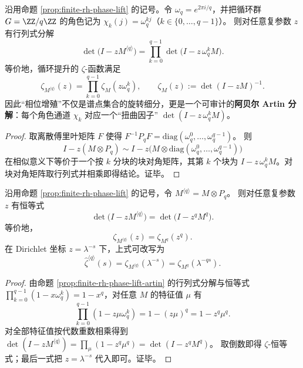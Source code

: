 \begin{proposition}\label{prop:finite-rh-phase-lift-artin}
沿用命题 \ref{prop:finite-rh-phase-lift} 的记号。令
\(
\omega_q=e^{2\pi i/q}
\)，并把循环群 \(G=\ZZ/q\ZZ\) 的角色记为 \(\chi_k(j)=\omega_q^{kj}\)（\(k\in\{0,\dots,q-1\}\)）。
则对任意复参数 \(z\) 有行列式分解
\[
\det\!\bigl(I-zM^{\langle q\rangle}\bigr)
=\prod_{k=0}^{q-1}\det\!\bigl(I-z\,\omega_q^k M\bigr).
\]
等价地，循环提升的 \(\zeta\)-函数满足
\[
\zeta_{M^{\langle q\rangle}}(z)
=\prod_{k=0}^{q-1}\zeta_{M}(z\omega_q^k),
\qquad
\zeta_M(z):=\det(I-zM)^{-1}.
\]
因此“相位增殖”不仅是谱点集合的旋转细分，更是一个可审计的\textbf{阿贝尔 Artin 分解}：每个角色通道 \(\chi_k\) 对应一个“扭曲因子” \(\det(I-z\,\omega_q^k M)\)。
\end{proposition}

\begin{proof}
取离散傅里叶矩阵 \(F\) 使得 \(F^{-1}P_qF=\mathrm{diag}(\omega_q^0,\dots,\omega_q^{q-1})\)。
则
\[
I-z(M\otimes P_q)
\sim
I-z\bigl(M\otimes \mathrm{diag}(\omega_q^0,\dots,\omega_q^{q-1})\bigr)
\]
在相似意义下等价于一个按 \(k\) 分块的块对角矩阵，其第 \(k\) 个块为 \(I-z\,\omega_q^k M\)。对块对角矩阵取行列式并相乘即得结论。证毕。
\end{proof}

\begin{corollary}\label{cor:finite-rh-phase-lift-time-rescale}
沿用命题 \ref{prop:finite-rh-phase-lift} 的记号，令 \(M^{\langle q\rangle}=M\otimes P_q\)。
则对任意复参数 \(z\) 有恒等式
\[
\det\!\bigl(I-zM^{\langle q\rangle}\bigr)=\det\!\bigl(I-z^q M^q\bigr).
\]
等价地，
\[
\zeta_{M^{\langle q\rangle}}(z)=\zeta_{M^q}(z^q).
\]
在 Dirichlet 坐标 \(z=\lambda^{-s}\) 下，上式可改写为
\[
\widehat{\zeta}^{\langle q\rangle}(s)
=\zeta_{M^{\langle q\rangle}}(\lambda^{-s})
=\zeta_{M^q}(\lambda^{-qs}).
\]
\end{corollary}

\begin{proof}
由命题 \ref{prop:finite-rh-phase-lift-artin} 的行列式分解与恒等式
\(
\prod_{k=0}^{q-1}(1-x\omega_q^k)=1-x^q
\)，对任意 \(M\) 的特征值 \(\mu\) 有
\[
\prod_{k=0}^{q-1}(1-z\mu\omega_q^k)=1-(z\mu)^q=1-z^q\mu^q.
\]
对全部特征值按代数重数相乘得到
\(
\det(I-zM^{\langle q\rangle})=\prod_{\mu}(1-z^q\mu^q)=\det(I-z^qM^q)
\)。
取倒数即得 \(\zeta\)-恒等式；最后一式把 \(z=\lambda^{-s}\) 代入即可。证毕。
\end{proof}

